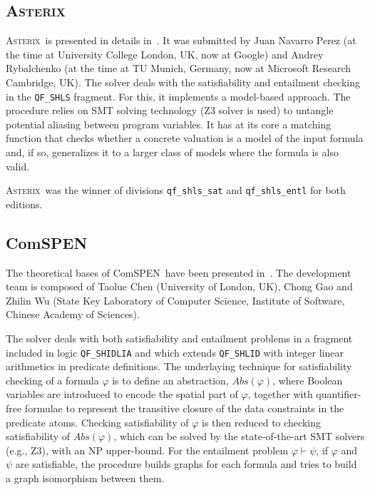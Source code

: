 \documentclass[orivec]{llncs}
\newcommand{\ASTERIX}{\textsc{Asterix}}
\newcommand{\ComSPEN}{Com\textsc{SPEN}}
\begin{document}
\subsection{\ASTERIX}

\ASTERIX\ is presented in details in~\cite{PerezR13}. It 
was submitted by 
Juan Navarro Perez (at the time at University College London, UK, now at Google) and 
Andrey Rybalchenko (at the time at TU Munich, Germany, now at Microsoft Research Cambridge, UK).
The solver deals with the satisfiability and entailment checking in the 
\verb|QF_SHLS| fragment.
For this, it implements a model-based approach.
The procedure relies on SMT solving technology (Z3 solver is used) to untangle potential aliasing between program variables. 
It has at its core a matching function that checks whether a concrete valuation is a model of the input formula and, if so, generalizes it to a larger class of models where the formula is also valid.  

\ASTERIX\ was the winner of divisions \verb|qf_shls_sat| and \verb|qf_shls_entl|
for both editions.


\subsection{\ComSPEN}

The theoretical bases of \ComSPEN\ have been presented in~\cite{DBLP:conf/cade/GuCW16}.
The development team is composed of 
Taolue Chen (University of London, UK), 
Chong Gao and Zhilin Wu (State Key Laboratory of Computer Science, Institute of Software, Chinese Academy of Sciences).

The solver deals with both satisfiability and entailment problems in
a fragment included in logic \verb|QF_SHIDLIA| and which extends \verb|QF_SHLID| with integer linear arithmetics in predicate definitions.
The underlaying technique for satisfiability checking of a formula $\varphi$ is to define an
abstraction, $Abs(\varphi)$, where Boolean variables are introduced to encode the spatial part of $\varphi$, together with quantifier-free formulae to represent the transitive closure of the data constraints in the predicate atoms. 
Checking satisfiability of $\varphi$ is then reduced to checking satisfiability of $Abs(\varphi)$, which can be solved by the state-of-the-art SMT solvers (e.g., Z3), 
with an NP upper-bound.
%
For the entailment problem $\varphi\vdash\psi$,  if $\varphi$ and $\psi$ are satisfiable, the procedure builds graphs for each formula and tries to build a graph isomorphism between them.
\end{document}
